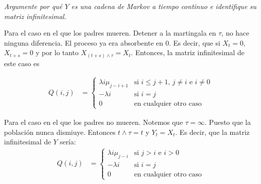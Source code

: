 \emph{
    Argumente por qu\'e $Y$ es una cadena de Markov a tiempo continuo e identifique su 
    matriz infinitesimal.\pn
}

\afterstatement\pn

Para el caso en el que los padres mueren. Detener a la martingala en $\tau$, no hace
ninguna diferencia. El proceso ya era absorbente en $0$. Es decir, que si $X_t = 0$,
$X_{t+s} = 0$ y por lo tanto $X_{(t+s) \wedge \tau} = X_t$. Entonces, la matriz infinitesimal
de este caso es

\begin{align}
        Q(i,j)  &=
                \begin{cases}
                    \lambda i \mu_{j-i+1}   &    \text{si $i \leq j+1$, $j \neq i$ e $i \neq 0$}    \\
                    -\lambda i              &    \text{si $i = j$}                                  \\
                    0                       &    \text{en cualquier otro caso}
                \end{cases}
\end{align}

Para el caso en el que los padres no mueren. Notemos que $\tau = \infty$. Puesto que la población
nunca dismiuye. Entonces $t \wedge \tau = t$ y $Y_t = X_t$. Es decir, que la matriz infinitesimal
de $Y$ sería:
\begin{align}
        Q(i,j)  &=
                \begin{cases}
                    \lambda i \mu_{j-i}     &    \text{si $j > i$ e $i > 0$}        \\
                    -\lambda i              &    \text{si $i = j$}                  \\
                    0                       &    \text{en cualquier otro caso}
                \end{cases}
\end{align}